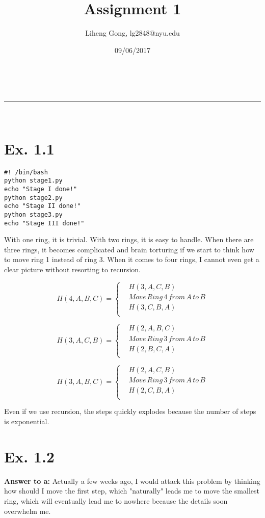 \documentclass[a4paper,11pt]{article}
\makeatletter
\newcommand{\linia}{\rule{\linewidth}{0.5pt}}
\theoremstyle{mytheor}
\renewcommand{\maketitle}{
\begin{center}
\vspace{2ex}
{\huge \textsc{\@title}}
\vspace{1ex}
\\
\linia\\
\@author \hfill \@date
\vspace{4ex}
\end{center}
}
\makeatother
\begin{document}
\title{Assignment \textnumero{} 1}

\author{Liheng Gong, lg2848@nyu.edu}

\date{09/06/2017}

\maketitle

\section*{Ex. 1.1}

\begin{lstlisting}[label={list:first},caption=Sample Bash code.]
#! /bin/bash
python stage1.py
echo "Stage I done!"
python stage2.py
echo "Stage II done!"
python stage3.py
echo "Stage III done!"
\end{lstlisting}

With one ring, it is trivial. With two rings, it is easy to handle. When there are three rings, it becomes complicated and brain torturing if we start to think how to move ring 1 instead of ring 3. When it comes to four rings, I cannot even get a clear picture without resorting to recursion.

$$H(4,A,B,C)=\left\{
\begin{aligned}
&H(3,A,C,B) \\
&Move\, Ring\, 4\, from\, A\, to\, B\\
&H(3,C,B,A) \\
\end{aligned}
\right.
$$

$$H(3,A,C,B)=\left\{
\begin{aligned}
&H(2,A,B,C) \\
&Move\, Ring\, 3\, from\, A\, to\, B\\
&H(2,B,C,A) \\
\end{aligned}
\right.
$$

$$H(3,A,B,C)=\left\{
\begin{aligned}
&H(2,A,C,B) \\
&Move\, Ring\, 3\, from\, A\, to\, B\\
&H(2,C,B,A) \\
\end{aligned}
\right.
$$

Even if we use recursion, the steps quickly explodes because the number of steps is exponential.


\section*{Ex. 1.2}
\textbf{Answer to a:} Actually a few weeks ago, I would attack this problem by thinking how should I move the first step, which "naturally" leads me to move the smallest ring, which will eventually lead me to nowhere because the details soon overwhelm me.
\end{document}
